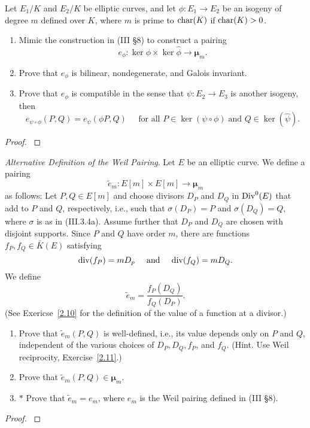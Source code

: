 \documentclass[12pt,reqno]{amsart}
\begin{document}
\begin{exe}\label{3.15}
Let $E_1/K$ and $E_2/K$ be elliptic curves, and let $\phi: E_1 \to E_2$ be an isogeny of degree $m$ defined over $K$, where $m$ is prime to ${\operatorname{char}}(K)$ if ${\operatorname{char}}(K)>0$.
\begin{enumerate}
\item
Mimic the construction in (III \S8) to construct a pairing
\[
e_\phi: \ker\phi \times \ker\hat{\phi}\longrightarrow {\mathbf{\mu}}_m.
\]

\item
Prove that $e_\phi$ is bilinear, nondegenerate, and Galois invariant.

\item
Prove that $e_\phi$ is compatible in the sense that $\psi: E_2 \to E_3$ is another isogeny, then
\[
e_{\psi \circ \phi}(P, Q)=e_\psi(\phi P, Q)\;\;\;\;\;\mbox{for all }P\in \ker(\psi\circ \phi)\;\mbox{and }Q\in\ker(\hat{\psi}).
\]
\end{enumerate}
\begin{proof}\label{s3.15}

\end{proof} 
\end{exe} 

\begin{exe}\label{3.16}
\emph{Alternative Definition of the Weil Pairing}.  Let $E$ be an elliptic curve.  We define a pairing
\[
\tilde{e}_m: E[m] \times E[m] \longrightarrow {\mathbf{\mu}}_m
\]
as follows: Let $P, Q \in E[m]$ and choose divisors $D_P$ and $D_Q$ in ${\operatorname{Div}}^0(E)$ that add to $P$ and $Q$, respectively, i.e., such that $\sigma(D_P)=P$ and $\sigma(D_Q)=Q$, where $\sigma$ is as in (III.3.4a).  Assume further that $D_P$ and $D_Q$ are chosen with disjoint supports.  Since $P$ and $Q$ have order $m$, there are functions $f_P, f_Q\in \bar{K}(E)$ satisfying
\[
{\operatorname{div}}(f_P)=mD_p \;\;\;\;\;{\mbox{and}}\;\;\;\;\;{\operatorname{div}}(f_Q)=mD_Q.
\]
We define
\[
\tilde{e}_m=\frac{f_P(D_Q)}{f_Q(D_P)}.
\]
(See Exericse~\ref{2.10} for the definition of the value of a function at a divisor.)
\begin{enumerate}
\item
Prove that $\tilde{e}_m(P, Q)$ is well-defined, i.e., its value depends only on $P$ and $Q$, independent of the various choices of $D_P, D_Q, f_P$, and $f_Q$.  (Hint.  Use Weil reciprocity, Exercise~\ref{2.11}.)

\item
Prove that $\tilde{e}_m(P, Q)\in \mathbf{\mu}_m$.
\item
$\ast$ Prove that $\tilde{e}_m=e_m$, where $e_m$ is the Weil pairing defined in (III \S8).
\end{enumerate}
\begin{proof}\label{s3.16}

\end{proof} 
\end{exe} 
\end{document}
